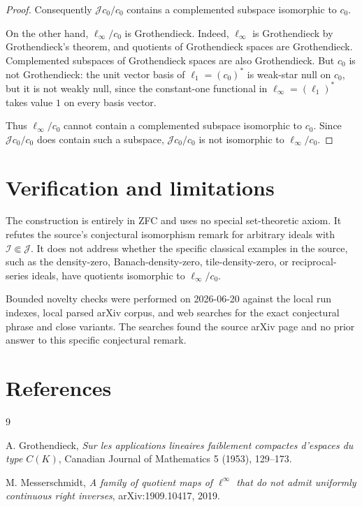 \documentclass[11pt]{article}
\newcommand{\J}{\mathcal J}
\newcommand{\I}{\mathcal I}
\begin{document}
\begin{proof}
Consequently $\J c_0/c_0$ contains a complemented subspace isomorphic
to $c_0$.

On the other hand, $\ell_\infty/c_0$ is Grothendieck.  Indeed,
$\ell_\infty$ is Grothendieck by Grothendieck's theorem, and quotients
of Grothendieck spaces are Grothendieck.  Complemented subspaces of
Grothendieck spaces are also Grothendieck.  But $c_0$ is not
Grothendieck: the unit vector basis of $\ell_1=(c_0)^*$ is weak-star
null on $c_0$, but it is not weakly null, since the constant-one
functional in $\ell_\infty=(\ell_1)^*$ takes value $1$ on every basis
vector.

Thus $\ell_\infty/c_0$ cannot contain a complemented subspace
isomorphic to $c_0$.  Since $\J c_0/c_0$ does contain such a subspace,
$\J c_0/c_0$ is not isomorphic to $\ell_\infty/c_0$.
\end{proof}

\section*{Verification and limitations}

The construction is entirely in ZFC and uses no special set-theoretic
axiom.  It refutes the source's conjectural isomorphism remark for
arbitrary ideals with $\I\Subset\J$.  It does not address whether the
specific classical examples in the source, such as the density-zero,
Banach-density-zero, tile-density-zero, or reciprocal-series ideals,
have quotients isomorphic to $\ell_\infty/c_0$.

Bounded novelty checks were performed on 2026-06-20 against the local
run indexes, local parsed arXiv corpus, and web searches for the exact
conjectural phrase and close variants.  The searches found the source
arXiv page and no prior answer to this specific conjectural remark.

\section*{References}

\begin{thebibliography}{9}

A. Grothendieck,
\emph{Sur les applications lineaires faiblement compactes d'espaces du type
$C(K)$},
Canadian Journal of Mathematics 5 (1953), 129--173.

M. Messerschmidt,
\emph{A family of quotient maps of $\ell^\infty$ that do not admit uniformly
continuous right inverses},
arXiv:1909.10417, 2019.

\end{thebibliography}
\end{document}
